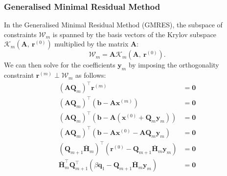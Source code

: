 \documentclass{article}
\begin{document}
\subsubsection{Generalised Minimal Residual Method}
In the Generalised Minimal Residual Method (GMRES), the subspace of
constraints \(\mathcal{W}_m\) is spanned by the basis vectors of the
Krylov subspace \(\mathcal{K}_m\left( \symbf{A},\: \symbf{r}^{\left( 0
\right)} \right)\) multiplied by the matrix \(\symbf{A}\):
\begin{equation*}
    \mathcal{W}_m = \symbf{A} \mathcal{K}_m\left( \symbf{A},\: \symbf{r}^{\left( 0 \right)} \right).
\end{equation*}
We can then solve for the coefficients \(\symbf{y}_m\) by imposing the
orthogonality constraint \(\symbf{r}^{\left( m \right)} \perp \mathcal{W}_m\)
as follows:
\begin{align*}
    \left( \symbf{A} \symbf{Q}_m \right)^\top \symbf{r}^{\left( m \right)}                                                                                    & = \symbf{0}                                                                                             \\
    \left( \symbf{A} \symbf{Q}_m \right)^\top \left( \symbf{b} - \symbf{A} \symbf{x}^{\left( m \right)} \right)                                               & = \symbf{0}                                                                                             \\
    \left( \symbf{A} \symbf{Q}_m \right)^\top \left( \symbf{b} - \symbf{A} \left( \symbf{x}^{\left( 0 \right)} + \symbf{Q}_m \symbf{y}_m \right) \right)      & = \symbf{0}                                                                                             \\
    \left( \symbf{A} \symbf{Q}_m \right)^\top \left( \symbf{b} - \symbf{A} \symbf{x}^{\left( 0 \right)} - \symbf{A} \symbf{Q}_m \symbf{y}_m \right)           & = \symbf{0}                                                                                             \\
    \left( \symbf{Q}_{m+1} \bar{\symbf{H}}_m \right)^\top \left( \symbf{r}^{\left( 0 \right)} - \symbf{Q}_{m+1} \bar{\symbf{H}}_m \symbf{y}_m \right)         & = \symbf{0}                                                                                             \\
    \bar{\symbf{H}}_m^\top \symbf{Q}_{m+1}^\top \left( \beta \symbf{q}_1 - \symbf{Q}_{m+1} \bar{\symbf{H}}_m \symbf{y}_m \right)                              & = \symbf{0}                                                                                             \\

\end{align*}
\end{document}
